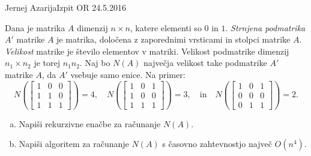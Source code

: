\begin{naloga}{Jernej Azarija}{Izpit OR 24.5.2016}
\begin{vprasanje}
Dana je matrika $A$ dimenzij $n \times n$, katere elementi so $0$ in $1$.
{\em Strnjena podmatrika} $A'$ matrike $A$ je matrika,
določena z zaporednimi vrsticami in stolpci matrike $A$.
{\em Velikost} matrike je število elementov v matriki.
Velikost podmatrike dimenzij $n_1 \times n_2$ je torej $n_1 n_2$.
Naj bo $N(A)$ največja velikost take podmatrike $A'$ matrike $A$,
da $A'$ vsebuje samo enice.
Na primer:
$$
N\left(\begin{bmatrix}
1 & 0 & 0 \\
1 & 1 & 0 \\
1 & 1 & 1
\end{bmatrix}\right) = 4, \quad
N\left(\begin{bmatrix}
1 & 0 & 1 \\
1 & 0 & 0 \\
1 & 1 & 1
\end{bmatrix}\right) = 3, \quad \text{in} \quad
N\left(\begin{bmatrix}
1 & 0 & 1 \\
0 & 0 & 0 \\
0 & 1 & 1
\end{bmatrix}\right) = 2.
$$

\begin{enumerate}[(a)]
\item Napiši rekurzivne enačbe za računanje $N(A)$.
\item Napiši algoritem za računanje $N(A)$
s časovno zahtevnostjo največ $O(n^4)$.
\end{enumerate}
\end{vprasanje}


\end{naloga}
